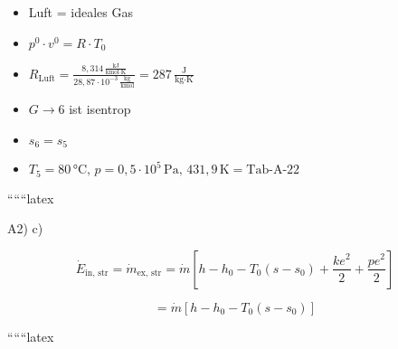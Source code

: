 \begin{itemize}
    \item Luft = ideales Gas
    \item $p^0 \cdot v^0 = R \cdot T_0$
    \item $R_{\text{Luft}} = \frac{8,314 \, \frac{\text{kJ}}{\text{kmol} \cdot \text{K}}}{28,87 \cdot 10^{-3} \, \frac{\text{kg}}{\text{kmol}}} = 287 \, \frac{\text{J}}{\text{kg} \cdot \text{K}}$
    \item $G \rightarrow 6$ ist isentrop
    \item $s_6 = s_5$
    \item $T_5 = 80 \, \text{°C}, \, p = 0,5 \cdot 10^5 \, \text{Pa}, \, 431,9 \, \text{K} = \text{Tab-A-22}$
\end{itemize}

``````latex

A2) c)

\[
\dot{E}_{\text{in, str}} = \dot{m}_{\text{ex, str}} = \dot{m} \left[ h - h_0 - T_0 (s - s_0) + \frac{ke^2}{2} + \frac{pe^2}{2} \right]
\]

\[
= \dot{m} \left[ h - h_0 - T_0 (s - s_0) \right]
\]

``````latex


